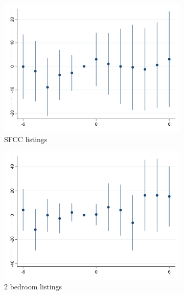 \clearpage
\begin{figure}[h!] \centering
    \caption{Sensitivity of event study results to rent variable}
    \label{appfig:event_study_change_depvar}
    \begin{subfigure}{0.5\textwidth} \centering
        \includegraphics[width=0.95\linewidth]{analysis/event_study/output/last_rent_sfcc_w6.png}
        \caption{SFCC listings} \label{appfig:event_study_SFCC}
    \end{subfigure}%
    \begin{subfigure}{0.5\textwidth} \centering
        \includegraphics[width=0.95\linewidth]{analysis/event_study/output/last_rent_2br_w6.png}
        \caption{2 bedroom listings} \label{appfig:event_study_2BR}
    \end{subfigure}\\
    \begin{subfigure}{0.5\textwidth} \centering

\end{subfigure}
\end{figure}
